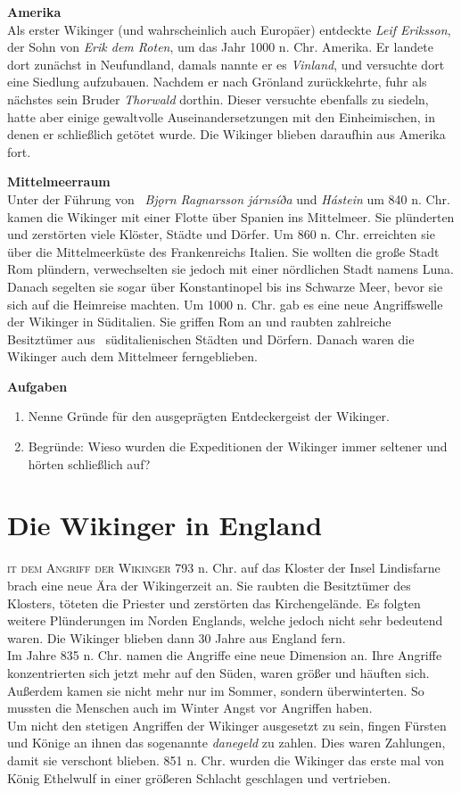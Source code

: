 \documentclass[12pt,a4paper,ngerman,openany]{book}
\newcommand{\flettrine}[2]{\lettrine[lines=2, depth=0, loversize=0.25, nindent=0.69pt, lraise=0.15]{\initfamily{#1}}{#2}}
\newcommand*\initfamily{\usefont{U}{GotIn}{xl}{n}}
\newcommand{\aufgaben}[1]{
  \begin{tcolorbox}
    \textbf{Aufgaben}
    \begin{enumerate}
      #1
    \end{enumerate}
  \end{tcolorbox}
} %
\begin{document}
\textbf{Amerika}\\
Als erster Wikinger (und wahrscheinlich auch Europäer) entdeckte \textit{Leif Eriksson}, der Sohn von \textit{Erik dem Roten}, um das Jahr 1000 n. Chr. Amerika. Er landete dort zunächst in Neufundland, damals nannte er es \textit{Vinland}, und versuchte dort eine Siedlung aufzubauen. Nachdem er nach Grönland zurückkehrte, fuhr als nächstes sein Bruder \textit{Thorwald} dorthin. Dieser versuchte ebenfalls zu siedeln, hatte aber einige gewaltvolle Auseinandersetzungen mit den Einheimischen, in denen er schließlich getötet wurde. Die Wikinger blieben daraufhin aus Amerika fort.

\textbf{Mittelmeerraum}\\
Unter der Führung von  \textit{Bjǫrn Ragnarsson járnsíða} und \textit{Hástein} um 840 n. Chr. kamen die Wikinger mit einer Flotte über Spanien ins Mittelmeer. Sie plünderten und zerstörten viele Klöster, Städte und Dörfer. Um 860 n. Chr. erreichten sie über die Mittelmeerküste des Frankenreichs Italien. Sie wollten die große Stadt Rom plündern, verwechselten sie jedoch mit einer nördlichen Stadt namens Luna. Danach segelten sie sogar über Konstantinopel bis ins Schwarze Meer, bevor sie sich auf die Heimreise machten. Um 1000 n. Chr. gab es eine neue Angriffswelle der Wikinger in Süditalien. Sie griffen Rom an und raubten zahlreiche Besitztümer aus  süditalienischen Städten und Dörfern.
Danach waren die Wikinger auch dem Mittelmeer ferngeblieben.

\aufgaben{
  \item Nenne Gründe für den ausgeprägten Entdeckergeist der Wikinger.
  \item Begründe: Wieso wurden die Expeditionen der Wikinger immer seltener und hörten schließlich auf?
}

\section{Die Wikinger in England}
\flettrine{M}{it dem Angriff der Wikinger} 793 n. Chr. auf das Kloster der Insel Lindisfarne brach eine neue Ära der Wikingerzeit an. Sie raubten die Besitztümer des Klosters, töteten die Priester und zerstörten das Kirchengelände. Es folgten weitere Plünderungen im Norden Englands, welche jedoch nicht sehr bedeutend waren. Die Wikinger blieben dann 30 Jahre aus England fern. \\
Im Jahre 835 n. Chr. namen die Angriffe eine neue Dimension an. Ihre Angriffe konzentrierten sich jetzt mehr auf den Süden, waren größer und häuften sich. Außerdem kamen sie nicht mehr nur im Sommer, sondern überwinterten. So mussten die Menschen auch im Winter Angst vor Angriffen haben. \\
Um nicht den stetigen Angriffen der Wikinger ausgesetzt zu sein, fingen Fürsten und Könige an ihnen das sogenannte \textit{danegeld} zu zahlen. Dies waren Zahlungen, damit sie verschont blieben.
851 n. Chr. wurden die Wikinger das erste mal von König Ethelwulf in einer größeren Schlacht geschlagen und vertrieben.
\end{document}
